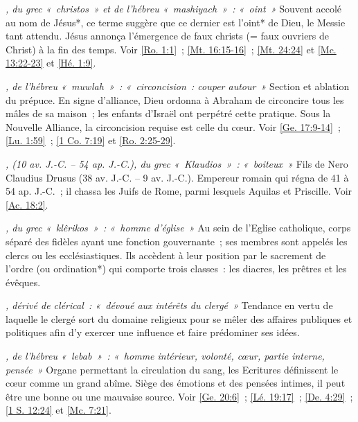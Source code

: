 \begin{multicols}{2}
\textit{, du grec «~christos~» et de l'hébreu «~mashiyach~»~: «~oint~»}\newline
Souvent accolé au nom de Jésus*, ce terme suggère que ce dernier est l'oint* de Dieu, le Messie tant attendu. Jésus annonça l'émergence de faux christs (= faux ouvriers de Christ) à la fin des temps. Voir \vref{Ro. 1:1}~; \vref{Mt. 16:15-16}~; \vref{Mt. 24:24} et \vref{Mc. 13:22-23} et \vref{Hé. 1:9}.

\textit{, de l'hébreu «~muwlah~»~: «~circoncision~: couper autour~»}\newline
Section et ablation du prépuce. En signe d'alliance, Dieu ordonna à Abraham de circoncire tous les mâles de sa maison~; les enfants d'Israël ont perpétré cette pratique. Sous la Nouvelle Alliance, la circoncision requise est celle du cœur. Voir \vref{Ge. 17:9-14}~; \vref{Lu. 1:59}~; \vref{1 Co. 7:19} et \vref{Ro. 2:25-29}.

\textit{, (10 av. J.-C. – 54 ap. J.-C.), du grec «~Klaudios~»~: «~boiteux~»}\newline
Fils de Nero Claudius Drusus (38 av. J.-C. – 9 av. J.-C.). Empereur romain qui régna de 41 à 54 ap. J.-C.~; il chassa les Juifs de Rome, parmi lesquels Aquilas et Priscille. Voir \vref{Ac. 18:2}.

\textit{, du grec «~klêrikos~»~: «~homme d'église~»}\newline
Au sein de l'Eglise catholique, corps séparé des fidèles ayant une fonction gouvernante~; ses membres sont appelés les clercs ou les ecclésiastiques. Ils accèdent à leur position par le sacrement de l'ordre (ou ordination*) qui comporte trois classes~: les diacres, les prêtres et les évêques.

\textit{, dérivé de clérical~: «~dévoué aux intérêts du clergé~»}\newline
Tendance en vertu de laquelle le clergé sort du domaine religieux pour se mêler des affaires publiques et politiques afin d'y exercer une influence et faire prédominer ses idées.

\textit{, de l'hébreu «~lebab~»~: «~homme intérieur, volonté, cœur, partie interne, pensée~»}\newline
Organe permettant la circulation du sang, les Ecritures définissent le cœur comme un grand abîme. Siège des émotions et des pensées intimes, il peut être une bonne ou une mauvaise source. Voir \vref{Ge. 20:6}~; \vref{Lé. 19:17}~; \vref{De. 4:29}~; \vref{1 S. 12:24} et \vref{Mc. 7:21}.


\end{multicols}
